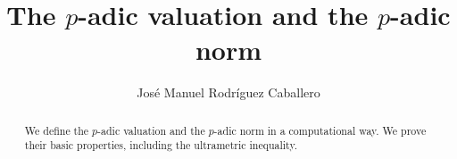 \documentclass[11pt,a4paper]{article}
\begin{document}
\title{The $p$-adic valuation and the $p$-adic norm}
\author{Jos\'e Manuel Rodr\'iguez Caballero}
\maketitle

\begin{abstract}
We define the $p$-adic valuation and the $p$-adic norm in a computational way. We prove their basic properties, including the ultrametric inequality.
\end{abstract}

\tableofcontents






\end{document}
